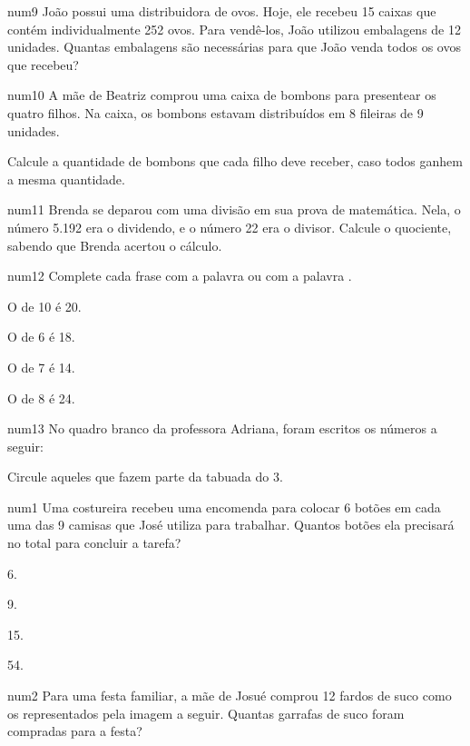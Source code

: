num9 João possui uma distribuidora de ovos. Hoje, ele recebeu 15 caixas
que contém individualmente 252 ovos. Para vendê-los, João utilizou
embalagens de 12 unidades. Quantas embalagens são necessárias para que
João venda todos os ovos que recebeu?

{}

num10 A mãe de Beatriz comprou uma caixa de bombons para presentear os
quatro filhos. Na caixa, os bombons estavam distribuídos em 8 fileiras
de 9 unidades.

{}

Calcule a quantidade de bombons que cada filho deve receber, caso todos
ganhem a mesma quantidade.

num11 Brenda se deparou com uma divisão em sua prova de matemática.
Nela, o número 5.192 era o dividendo, e o número 22 era o divisor.
Calcule o quociente, sabendo que Brenda acertou o cálculo.

{}

num12 Complete cada frase com a palavra  ou com a
palavra .

O de 10 é 20.

O de 6 é 18.

O de 7 é 14.

O de 8 é 24.

num13 No quadro branco da professora Adriana, foram escritos os números
a seguir:

{}

Circule aqueles que fazem parte da tabuada do 3.

\subsubject[title={Treino},reference={treino}]

num1 Uma costureira recebeu uma encomenda para colocar 6 botões em cada
uma das 9 camisas que José utiliza para trabalhar. Quantos botões ela
precisará no total para concluir a tarefa?

{}

6.

9.

15.

54.

num2 Para uma festa familiar, a mãe de Josué comprou 12 fardos de suco
como os representados pela imagem a seguir. Quantas garrafas de suco
foram compradas para a festa?

{}

